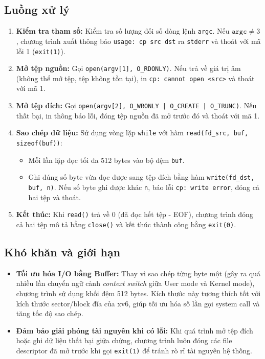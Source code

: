 \subsection{Luồng xử lý}
\begin{enumerate}
  \item \textbf{Kiểm tra tham số:} Kiểm tra số lượng đối số dòng lệnh \texttt{argc}. Nếu $\texttt{argc} \neq 3$, chương trình xuất thông báo \texttt{usage: cp src dst} ra \texttt{stderr} và thoát với mã lỗi 1 (\texttt{exit(1)}).
  \item \textbf{Mở tệp nguồn:} Gọi \texttt{open(argv[1], O\_RDONLY)}. Nếu trả về giá trị âm (không thể mở tệp, tệp không tồn tại), in \texttt{cp: cannot open <src>} và thoát với mã 1.
  \item \textbf{Mở tệp đích:} Gọi \texttt{open(argv[2], O\_WRONLY | O\_CREATE | O\_TRUNC)}. Nếu thất bại, in thông báo lỗi, đóng tệp nguồn đã mở trước đó và thoát với mã 1.
  \item \textbf{Sao chép dữ liệu:} Sử dụng vòng lặp \texttt{while} với hàm \texttt{read(fd\_src, buf, sizeof(buf))}:
    \begin{itemize}
      \item Mỗi lần lặp đọc tối đa 512 bytes vào bộ đệm \texttt{buf}.
      \item Ghi đúng số byte vừa đọc được sang tệp đích bằng hàm \texttt{write(fd\_dst, buf, n)}. Nếu số byte ghi được khác \texttt{n}, báo lỗi \texttt{cp: write error}, đóng cả hai tệp và thoát.
    \end{itemize}
  \item \textbf{Kết thúc:} Khi \texttt{read()} trả về 0 (đã đọc hết tệp - EOF), chương trình đóng cả hai tệp mô tả bằng \texttt{close()} và kết thúc thành công bằng \texttt{exit(0)}.
\end{enumerate}

\subsection{Khó khăn và giới hạn}
\begin{itemize}
  \item \textbf{Tối ưu hóa I/O bằng Buffer:} Thay vì sao chép từng byte một (gây ra quá nhiều lần chuyển ngữ cảnh \textit{context switch} giữa User mode và Kernel mode), chương trình sử dụng khối đệm 512 bytes. Kích thước này tương thích tốt với kích thước sector/block đĩa của xv6, giúp tối ưu hóa số lần gọi system call và tăng tốc độ sao chép.
  \item \textbf{Đảm bảo giải phóng tài nguyên khi có lỗi:} Khi quá trình mở tệp đích hoặc ghi dữ liệu thất bại giữa chừng, chương trình luôn đóng các file descriptor đã mở trước khi gọi \texttt{exit(1)} để tránh rò rỉ tài nguyên hệ thống.
\end{itemize}

